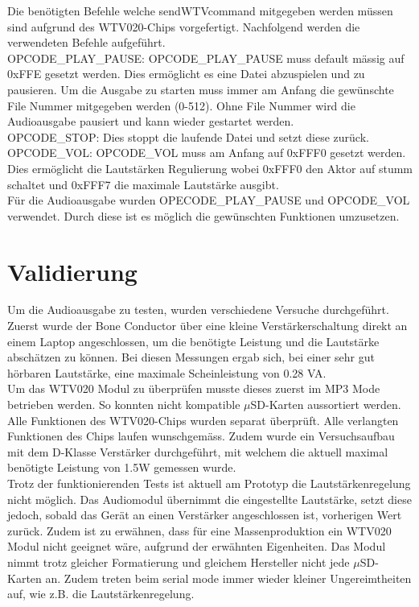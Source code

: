 Die benötigten Befehle welche sendWTVcommand mitgegeben werden müssen sind aufgrund des WTV020-Chips vorgefertigt.
Nachfolgend werden die verwendeten Befehle aufgeführt.\\
OPCODE\_PLAY\_PAUSE: OPCODE\_PLAY\_PAUSE muss default mässig auf 0xFFE gesetzt werden. Dies ermöglicht es eine Datei abzuspielen und zu pausieren. Um die Ausgabe zu starten muss immer am Anfang die gewünschte File Nummer mitgegeben werden (0-512). Ohne File Nummer wird die Audioausgabe pausiert und kann wieder gestartet werden.  \\
OPCODE\_STOP: Dies stoppt die laufende Datei und setzt diese zurück.\\
OPCODE\_VOL: OPCODE\_VOL muss am Anfang auf 0xFFF0 gesetzt werden. Dies ermöglicht die Lautstärken Regulierung wobei 0xFFF0 den Aktor auf stumm schaltet und 0xFFF7 die maximale Lautstärke ausgibt. \\
Für die Audioausgabe wurden OPECODE\_PLAY\_PAUSE und OPCODE\_VOL verwendet. Durch diese ist es möglich die gewünschten Funktionen umzusetzen. 

\section{Validierung}
Um die Audioausgabe zu testen, wurden verschiedene Versuche durchgeführt. Zuerst wurde der Bone Conductor über eine kleine Verstärkerschaltung direkt an einem Laptop angeschlossen, um die benötigte Leistung und die Lautstärke abschätzen zu können. Bei diesen Messungen ergab sich, bei einer sehr gut hörbaren Lautstärke, eine maximale Scheinleistung von 0.28 VA.\\
Um das WTV020 Modul zu überprüfen musste dieses zuerst im MP3 Mode betrieben werden.
So konnten nicht kompatible $\mu$SD-Karten aussortiert werden. \\
Alle Funktionen des WTV020-Chips wurden separat überprüft. Alle verlangten Funktionen des Chips laufen wunschgemäss. Zudem wurde ein Versuchsaufbau mit dem D-Klasse Verstärker durchgeführt, mit welchem die aktuell maximal benötigte Leistung von 1.5W gemessen wurde. \\
Trotz der funktionierenden Tests ist aktuell am Prototyp die Lautstärkenregelung nicht möglich. Das Audiomodul übernimmt die eingestellte Lautstärke, setzt diese jedoch, sobald das Gerät an einen Verstärker angeschlossen ist, vorherigen Wert zurück. Zudem ist zu erwähnen, dass für eine Massenproduktion ein WTV020 Modul nicht geeignet wäre, aufgrund der erwähnten Eigenheiten. Das Modul nimmt trotz gleicher Formatierung und gleichem Hersteller nicht jede $\mu$SD-Karten an. Zudem treten beim serial mode immer wieder kleiner Ungereimtheiten auf, wie z.B. die Lautstärkenregelung. 
